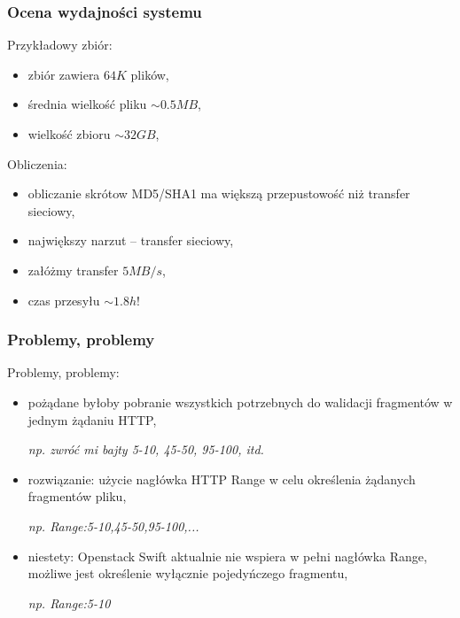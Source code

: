 \documentclass{beamer}
\begin{document}
\begin{frame}
\frametitle{Ocena wydajności systemu}

\begin{block}{Przykładowy zbiór:}
\begin{itemize}
	\item zbiór zawiera $64K$ plików,
	\item średnia wielkość pliku $\sim 0.5MB$,
	\item wielkość zbioru $\sim 32GB$,
\end{itemize}
\end{block}

\begin{block}{Obliczenia:}
\begin{itemize}
	\item obliczanie skrótow MD5/SHA1 ma większą przepustowość niż transfer sieciowy,
	\item największy narzut -- transfer sieciowy,
	\item załóżmy transfer $5MB/s$,
	\item czas przesyłu $\sim 1.8h$!
\end{itemize}
\end{block}
\end{frame}

\begin{frame}
\frametitle{Problemy, problemy}
\begin{block}{Problemy, problemy:}
\begin{itemize}
	\item pożądane byłoby pobranie wszystkich potrzebnych do walidacji fragmentów w jednym żądaniu HTTP,

	\textit{np. zwróć mi bajty 5-10, 45-50, 95-100, itd.}
	\item rozwiązanie: użycie nagłówka HTTP Range w celu określenia żądanych fragmentów pliku,

	\textit{np. Range:5-10,45-50,95-100,...}	
	\item niestety: Openstack Swift aktualnie nie wspiera w pełni nagłówka Range, możliwe jest określenie wyłącznie pojedyńczego fragmentu,

	\textit{np. Range:5-10}
\end{itemize}
\end{block}
\end{frame}
\end{document}
